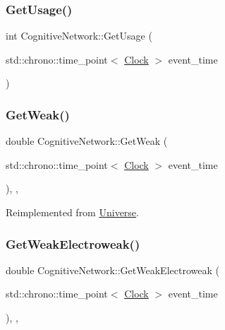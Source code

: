 \mbox{\label{classCognitiveNetwork_ad293916cfa0e454ef40d7e228d0dcba3}} 
\subsubsection{\texorpdfstring{Get\+Usage()}{GetUsage()}}
{\footnotesize\ttfamily int Cognitive\+Network\+::\+Get\+Usage (\begin{DoxyParamCaption}\item[{std\+::chrono\+::time\+\_\+point$<$ \mbox{\hyperlink{universe_8h_a0ef8d951d1ca5ab3cfaf7ab4c7a6fd80}{Clock}} $>$}]{event\+\_\+time }\end{DoxyParamCaption})\hspace{0.3cm}{\ttfamily [inline]}}

\mbox{\label{classCognitiveNetwork_a761db75ac8eab7b4625e5a398891bd12}} 
\subsubsection{\texorpdfstring{Get\+Weak()}{GetWeak()}}
{\footnotesize\ttfamily double Cognitive\+Network\+::\+Get\+Weak (\begin{DoxyParamCaption}\item[{std\+::chrono\+::time\+\_\+point$<$ \mbox{\hyperlink{universe_8h_a0ef8d951d1ca5ab3cfaf7ab4c7a6fd80}{Clock}} $>$}]{event\+\_\+time }\end{DoxyParamCaption})\hspace{0.3cm}{\ttfamily [inline]}, {\ttfamily [final]}, {\ttfamily [virtual]}}



Reimplemented from \mbox{\hyperlink{classUniverse_a4476b7e0a3fc1764909f556257fd9ec7}{Universe}}.

\mbox{\label{classCognitiveNetwork_aa6342c390fe8e7c648b4c6bc8f93ba4a}} 
\subsubsection{\texorpdfstring{Get\+Weak\+Electroweak()}{GetWeakElectroweak()}}
{\footnotesize\ttfamily double Cognitive\+Network\+::\+Get\+Weak\+Electroweak (\begin{DoxyParamCaption}\item[{std\+::chrono\+::time\+\_\+point$<$ \mbox{\hyperlink{universe_8h_a0ef8d951d1ca5ab3cfaf7ab4c7a6fd80}{Clock}} $>$}]{event\+\_\+time }\end{DoxyParamCaption})\hspace{0.3cm}{\ttfamily [inline]}, {\ttfamily [final]}, {\ttfamily [virtual]}}



